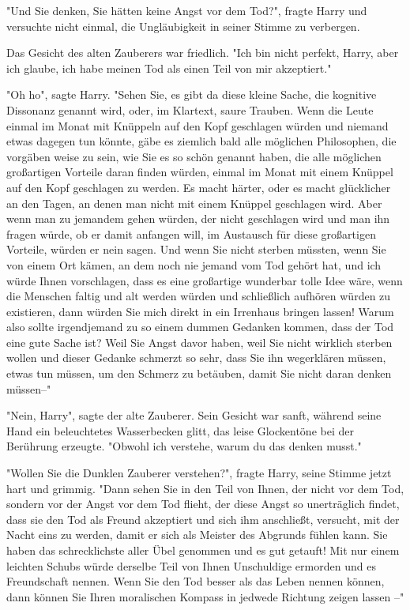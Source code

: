 {"Und Sie denken, Sie hätten keine Angst vor dem Tod?", fragte Harry und versuchte nicht einmal, die Ungläubigkeit in seiner Stimme zu verbergen.

Das Gesicht des alten Zauberers war friedlich. "Ich bin nicht perfekt, Harry, aber ich glaube, ich habe meinen Tod als einen Teil von mir akzeptiert."

"Oh ho", sagte Harry. "Sehen Sie, es gibt da diese kleine Sache, die kognitive Dissonanz genannt wird, oder, im Klartext, saure Trauben. Wenn die Leute einmal im Monat mit Knüppeln auf den Kopf geschlagen würden und niemand etwas dagegen tun könnte, gäbe es ziemlich bald alle möglichen Philosophen, die vorgäben weise zu sein, wie Sie es so schön genannt haben, die alle möglichen großartigen Vorteile daran finden würden, einmal im Monat mit einem Knüppel auf den Kopf geschlagen zu werden. Es macht härter, oder es macht glücklicher an den Tagen, an denen man nicht mit einem Knüppel geschlagen wird. Aber wenn man zu jemandem gehen würden, der nicht geschlagen wird und man ihn fragen würde, ob er damit anfangen will, im Austausch für diese großartigen Vorteile, würden er nein sagen. Und wenn Sie nicht sterben müssten, wenn Sie von einem Ort kämen, an dem noch nie jemand vom Tod gehört hat, und ich würde Ihnen vorschlagen, dass es eine großartige wunderbar tolle Idee wäre, wenn die Menschen faltig und alt werden würden und schließlich aufhören würden zu existieren, dann würden Sie mich direkt in ein Irrenhaus bringen lassen! Warum also sollte irgendjemand zu so einem dummen Gedanken kommen, dass der Tod eine gute Sache ist? Weil Sie Angst davor haben, weil Sie nicht wirklich sterben wollen und dieser Gedanke schmerzt so sehr, dass Sie ihn wegerklären müssen, etwas tun müssen, um den Schmerz zu betäuben, damit Sie nicht daran denken müssen--"

"Nein, Harry", sagte der alte Zauberer. Sein Gesicht war sanft, während seine Hand ein beleuchtetes Wasserbecken glitt, das leise Glockentöne bei der Berührung erzeugte. "Obwohl ich verstehe, warum du das denken musst."

"Wollen Sie die Dunklen Zauberer verstehen?", fragte Harry, seine Stimme jetzt hart und grimmig. "Dann sehen Sie in den Teil von Ihnen, der nicht vor dem Tod, sondern vor der Angst vor dem Tod flieht, der diese Angst so unerträglich findet, dass sie den Tod als Freund akzeptiert und sich ihm anschließt, versucht, mit der Nacht eins zu werden, damit er sich als Meister des Abgrunds fühlen kann. Sie haben das schrecklichste aller Übel genommen und es gut getauft! Mit nur einem leichten Schubs würde derselbe Teil von Ihnen Unschuldige ermorden und es Freundschaft nennen. Wenn Sie den Tod besser als das Leben nennen können, dann können Sie Ihren moralischen Kompass in jedwede Richtung zeigen lassen --"

}
